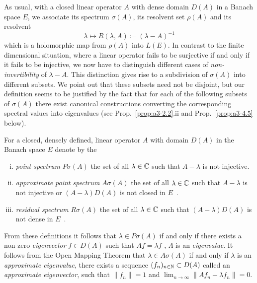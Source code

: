 As usual, with a closed linear operator $A$ with dense domain $D(A)$ in a Banach space $E$, we associate its spectrum $\sigma(A)$, its resolvent set $\rho(A)$ and its resolvent
\[
    \lambda \mapsto R(\lambda,A) \coloneqq (\lambda - A)^{-1}
\]
which is a holomorphic map from $\rho(A)$ into $L(E)$.
In contrast to the finite dimensional situation, where a linear operator fails to be surjective if and only if it fails to be injective, we now have to distinguish different cases of \emph{non-invertibility} of $\lambda - A$.
This distinction gives rise to a subdivision of $\sigma(A)$ into different subsets.
We point out that these subsets need not be disjoint, but our definition seems
to be justified by the fact that for each of the following subsets of $\sigma(A)$ there exist canonical constructions converting the corresponding spectral values into eigenvalues (see Prop.~\ref{prop:a3-2.2}.ii and Prop.~\ref{prop:a3-4.5} below).
\begin{definition}\label{def:a3-2.1}
For a closed, densely defined, linear operator $A$ with domain $D(A)$ in the Banach space $E$ denote by the
\begin{enumerate}[(i)]
\item 
\emph{point spectrum} $P\sigma(A)$ the set of all $\lambda \in \mathbb{C}$ such that 
$A - \lambda$ is not injective.

\item 
\emph{approximate point spectrum} $A\sigma(A)$ the set of all $\lambda \in \mathbb{C}$ such that $A - \lambda$ is not injective or $(A - \lambda)D(A)$ is not closed in $E$~.

\item 
\emph{residual spectrum} $R\sigma(A)$ the set of all $\lambda \in \mathbb{C}$ such that $(A - \lambda)D(A)$ is not dense in $E$~.
\end{enumerate}
\end{definition}
From these definitions it follows that $\lambda \in P\sigma(A)$ if and only if there exists a non-zero \emph{eigenvector} $f \in D(A)$ such that $Af = \lambda f$ \ie, $\Lambda$ is an \emph{eigenvalue}.
It follows from the Open Mapping Theorem that $\lambda \in A\sigma(A)$ if and only if $\lambda$ is an \emph{approximate eigenvalue}, \ie there exists a sequence $(f_{n})_{n \in \mathbb{N}} \subset D(A)$ called an\emph{ approximate eigenvector}, such that $\|f_{n}\| = 1$ and $ \lim_{n \to \infty} \|Af_{n} - \lambda f_{n}\| = 0$.


